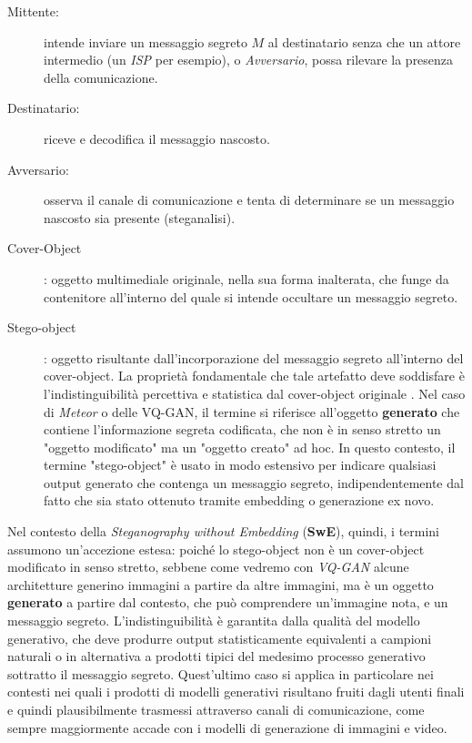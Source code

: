 \begin{description}
	\item[Mittente:] intende inviare un messaggio segreto $M$ al destinatario senza che un attore intermedio (un \emph{ISP} per esempio), o \textit{Avversario}, possa rilevare la presenza della comunicazione.
	\item[Destinatario:] riceve e decodifica il messaggio nascosto.
	\item[Avversario:] osserva il canale di comunicazione e tenta di determinare se un messaggio nascosto sia presente (steganalisi).
	\item[Cover-Object]: oggetto multimediale originale, nella sua forma inalterata, che funge da contenitore all'interno del quale si intende occultare un messaggio segreto.
	\item [Stego-object]: oggetto risultante dall'incorporazione del messaggio segreto all'interno del cover-object. La proprietà fondamentale che tale artefatto deve soddisfare è l'indistinguibilità percettiva e statistica dal cover-object originale \cite{simmons-1984}. Nel caso di \emph{Meteor} o delle VQ-GAN, il termine si riferisce all'oggetto \textbf{generato} che contiene l'informazione segreta codificata, che non è in senso stretto un "oggetto modificato" ma un "oggetto creato" ad hoc. In questo contesto, il termine "stego-object" è usato in modo estensivo per indicare qualsiasi output generato che contenga un messaggio segreto, indipendentemente dal fatto che sia stato ottenuto tramite embedding o generazione ex novo.
\end{description}

Nel contesto della \emph{Steganography without Embedding} (\textbf{SwE}), quindi, i termini assumono un'accezione estesa: poiché lo stego-object non è un cover-object modificato in senso stretto, sebbene come vedremo con \emph{VQ-GAN} alcune architetture generino immagini a partire da altre immagini, ma è un oggetto \textbf{generato} a partire dal contesto, che può comprendere un'immagine nota, e un messaggio segreto. L'indistinguibilità è garantita dalla qualità del modello generativo, che deve produrre output statisticamente equivalenti a campioni naturali o in alternativa a prodotti tipici del medesimo processo generativo sottratto il messaggio segreto. Quest'ultimo caso si applica in particolare nei contesti nei quali i prodotti di modelli generativi risultano fruiti dagli utenti finali e quindi plausibilmente trasmessi attraverso canali di comunicazione, come sempre maggiormente accade con i modelli di generazione di immagini e video.

